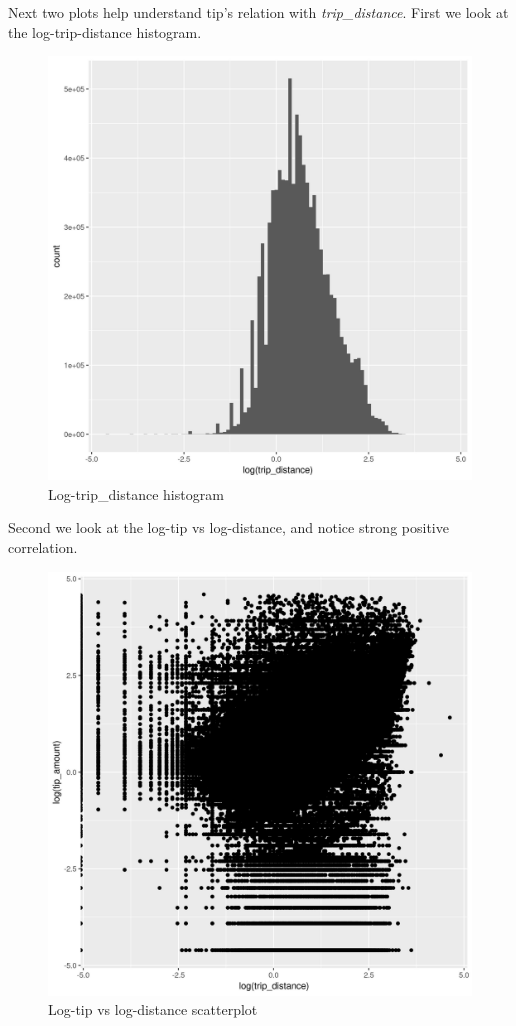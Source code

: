 \documentclass[11pt]{article}
\begin{document}
Next two plots help understand tip's relation with \emph{trip\_distance}.
First we look at the log-trip-distance histogram.
\begin{figure}[htbp]
\centering
\includegraphics[width=.9\linewidth]{./plots/logTripDistanceHist.jpg}
\caption{\label{fig:orge5fda18}
Log-trip\_distance histogram}
\end{figure}

Second we look at the log-tip vs log-distance, and notice strong
positive correlation.
\begin{figure}[htbp]
\centering
\includegraphics[width=.9\linewidth]{./plots/distanceTipPlot.jpg}
\caption{\label{fig:org392ec20}
Log-tip vs log-distance scatterplot}
\end{figure}
\end{document}

